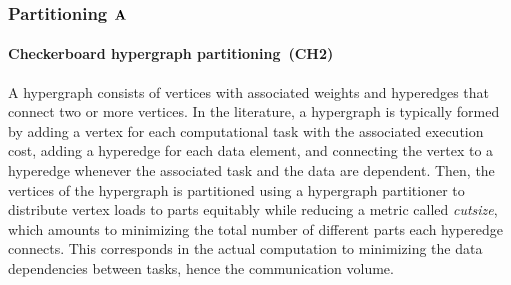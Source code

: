 
\subsubsection{Partitioning $\mathbf{A}$} \label{sec:cp1d}

\paragraph{Checkerboard hypergraph partitioning~(\textbf{CH2})}
A hypergraph consists of vertices with associated weights and hyperedges that connect two or more vertices.
In the literature, a hypergraph is typically formed by adding a vertex for each computational task with the associated execution cost, adding a hyperedge for each data element, and connecting the vertex to a hyperedge whenever the associated task and the data are dependent.
Then, the vertices of the hypergraph is partitioned using a hypergraph partitioner to distribute vertex loads to parts equitably while reducing a metric called \emph{cutsize}, which amounts to minimizing the total number of different parts each hyperedge connects.
This corresponds in the actual computation to minimizing the data dependencies between tasks, hence the communication volume.

